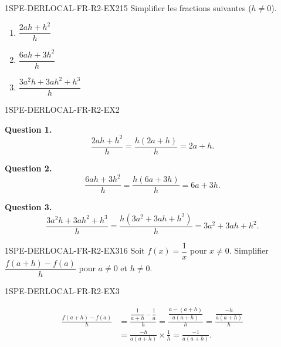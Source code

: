 
\begin{exercice}{1SPE-DERLOCAL-FR-R2-EX2}{1}{5}
Simplifier les fractions suivantes ($h
\neq 0$).
\begin{enumerate}
  \item $\dfrac{2ah + h^2}{h}$
  \item $\dfrac{6ah + 3h^2}{h}$
  \item $\dfrac{3a^2h + 3ah^2 + h^3}{h}$
\end{enumerate}
\end{exercice}


\begin{corrige}{1SPE-DERLOCAL-FR-R2-EX2}


\textbf{Question 1.}
\[
\frac{2ah + h^2}{h} = \frac{h(2a + h)}{h} = 2a + h.
\]

\textbf{Question 2.}
\[
\frac{6ah + 3h^2}{h} = \frac{h(6a + 3h)}{h} = 6a + 3h.
\]

\textbf{Question 3.}
\[
\frac{3a^2h + 3ah^2 + h^3}{h} = \frac{h(3a^2 + 3ah + h^2)}{h} = 3a^2 + 3ah + h^2.
\]

\end{corrige}


\begin{exercice}{1SPE-DERLOCAL-FR-R2-EX3}{1}{6}
Soit $f(x) = \dfrac{1}{x}$ pour $x
\neq 0$. Simplifier $\dfrac{f(a+h) - f(a)}{h}$ pour $a
\neq 0$ et $h
\neq 0$.
\end{exercice}


\begin{corrige}{1SPE-DERLOCAL-FR-R2-EX3}


\begin{align*}
\frac{f(a+h) - f(a)}{h}
  &= \frac{\dfrac{1}{a+h} - \dfrac{1}{a}}{h}
   = \frac{\dfrac{a - (a+h)}{a(a+h)}}{h}
   = \frac{\dfrac{-h}{a(a+h)}}{h} \\
  &= \frac{-h}{a(a+h)} \times \frac{1}{h}
   = \frac{-1}{a(a+h)}.
\end{align*}

\end{corrige}
